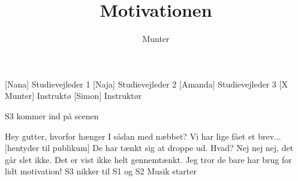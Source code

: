 \documentclass[a4paper,11pt]{article}
\title{Motivationen}
\author{Munter}
\begin{document}
 \maketitle

\begin{roles}
       [Nana] Studievejleder 1
       [Naja] Studievejleder 2
       [Amanda] Studievejleder 3
       [X Munter] Instruktø
       [Simon] Instruktør
\end{roles}


\scene S3 kommer ind på scenen

\begin{sketch}
        Hey gutter, hvorfor hænger I sådan med næbbet?
        Vi har lige fået et brev...
       [hentyder til publikum] De har tænkt sig at droppe ud.
        Hvad? Nej nej nej, det går slet ikke. Det er vist ikke helt
gennemtænkt. Jeg tror de bare har brug for lidt motivation!
       \scene S3 nikker til S1 og S2
       \scene Musik starter
\end{sketch}
\end{document}
